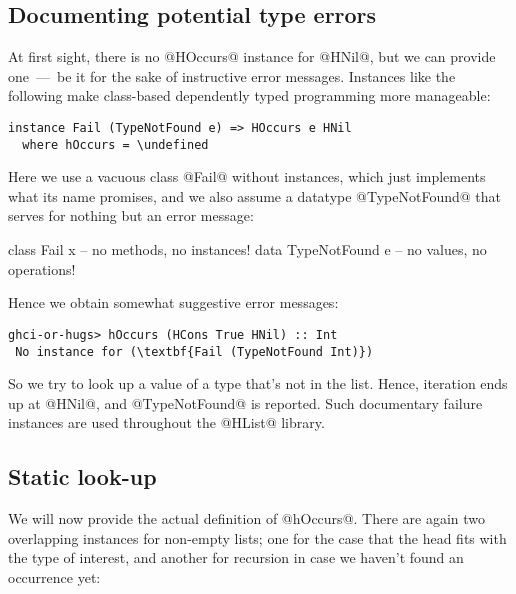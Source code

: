 \documentclass[nocopyrightspace,preprint]{sigplan-proc}
\newcommand{\undefined}{\ensuremath{\bot}}
\begin{document}
\medskip

\subsection*{Documenting potential type errors}

At first sight, there is no @HOccurs@ instance for @HNil@, but we can
provide one~---~be it for the sake of instructive error messages.
Instances like the following make class-based dependently typed
programming more manageable:

\begin{Verbatim}[commandchars=\\\{\}]
 instance Fail (TypeNotFound e) => HOccurs e HNil
  where hOccurs = \undefined
\end{Verbatim}

Here we use a vacuous class @Fail@ without instances, which just
implements what its name promises, and we also assume a datatype
@TypeNotFound@ that serves for nothing but an error message:

\begin{code}
 class Fail x        -- no methods, no instances!
 data TypeNotFound e -- no values, no operations! 
\end{code}

Hence we obtain somewhat suggestive error messages:

\begin{Verbatim}[commandchars=\\\{\}]
 ghci-or-hugs> hOccurs (HCons True HNil) :: Int
 No instance for (\textbf{Fail (TypeNotFound Int)})
\end{Verbatim}

So we try to look up a value of a type that's not in the
list. Hence, iteration ends up at @HNil@, and @TypeNotFound@ is
reported. Such documentary failure instances are used throughout the
@HList@ library.



\medskip

\subsection*{Static look-up}

We will now provide the actual definition of @hOccurs@. There are
again two overlapping instances for non-empty lists; one for the case
that the head fits with the type of interest, and another for
recursion in case we haven't found an occurrence yet:
\end{document}

